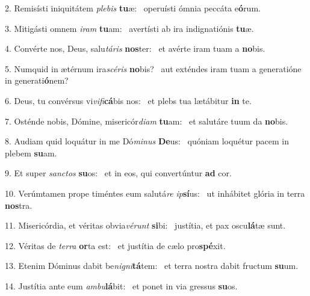 2. Remisísti iniquitátem \textit{ple}\textit{bis} \textbf{tu}æ: \ast\  operuísti ómnia peccáta e\textbf{ó}rum.\

3. Mitigásti omnem \textit{i}\textit{ram} \textbf{tu}am: \ast\  avertísti ab ira indignatiónis \textbf{tu}æ.\

4. Convérte nos, Deus, salu\textit{tá}\textit{ris} \textbf{nos}ter: \ast\  et avérte iram tuam a \textbf{no}bis.\

5. Numquid in ætérnum ira\textit{scé}\textit{ris} \textbf{no}bis? \ast\  aut exténdes iram tuam a generatióne in generati\textbf{ó}nem?\

6. Deus, tu convérsus vi\textit{vi}\textit{fi}\textbf{cá}bis nos: \ast\  et plebs tua lætábitur \textbf{in} te.\

7. Osténde nobis, Dómine, misericór\textit{di}\textit{am} \textbf{tu}am: \ast\  et salutáre tuum da \textbf{no}bis.\

8. Audiam quid loquátur in me Dó\textit{mi}\textit{nus} \textbf{De}us: \ast\  quóniam loquétur pacem in plebem \textbf{su}am.\

9. Et super \textit{sanc}\textit{tos} \textbf{su}os: \ast\  et in eos, qui convertúntur \textbf{ad} cor.\

10. Verúmtamen prope timéntes eum salutá\textit{re} \textit{ip}\textbf{sí}us: \ast\  ut inhábitet glória in terra \textbf{nos}tra.\

11. Misericórdia, et véritas obvia\textit{vé}\textit{runt} \textbf{si}bi: \ast\  justítia, et pax oscu\textbf{lá}tæ sunt.\

12. Véritas de \textit{ter}\textit{ra} \textbf{or}ta est: \ast\  et justítia de cælo pro\textbf{spé}xit.\

13. Etenim Dóminus dabit be\textit{ni}\textit{gni}\textbf{tá}tem: \ast\  et terra nostra dabit fructum \textbf{su}um.\

14. Justítia ante eum \textit{am}\textit{bu}\textbf{lá}bit: \ast\  et ponet in via gressus \textbf{su}os.\

